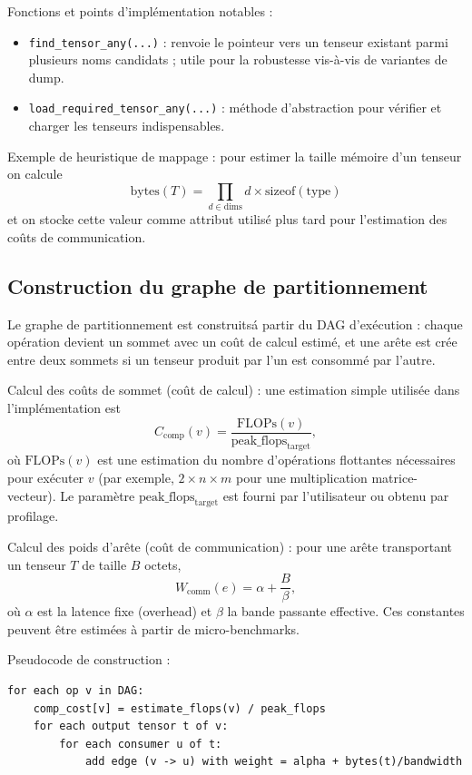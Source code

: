 \documentclass[11pt,a4paper]{article}
\begin{document}
Fonctions et points d'impl\'ementation notables :
\begin{itemize}[leftmargin=*]
	\item \texttt{find\_tensor\_any(...)} : renvoie le pointeur vers un tenseur existant parmi plusieurs noms candidats ; utile pour la robustesse vis-\`a-vis de variantes de dump.
	\item \texttt{load\_required\_tensor\_any(...)} : m\'ethode d'abstraction pour v\'erifier et charger les tenseurs indispensables.
\end{itemize}

Exemple de heuristique de mappage : pour estimer la taille m\'emoire d'un tenseur on calcule
\[
\mathrm{bytes}(T) = \prod_{d\in \mathrm{dims}} d \times \mathrm{sizeof}(\text{type})
\]
et on stocke cette valeur comme attribut utilis\'e plus tard pour l'estimation des co\^uts de communication.

\subsection{Construction du graphe de partitionnement}

Le graphe de partitionnement est construits\'a partir du DAG d'ex\'ecution : chaque op\'eration devient un sommet avec un co\^ut de calcul estim\'e, et une ar\^ete est cr\'ee entre deux sommets si un tenseur produit par l'un est consomm\'e par l'autre.

Calcul des co\^uts de sommet (co\^ut de calcul) : une estimation simple utilis\'ee dans l'impl\'ementation est
\[
C_{\mathrm{comp}}(v) = \frac{\mathrm{FLOPs}(v)}{\mathrm{peak\_flops}_{\mathrm{target}}},
\]
o\`u $\mathrm{FLOPs}(v)$ est une estimation du nombre d'op\'erations flottantes n\'ecessaires pour ex\'ecuter $v$ (par exemple, $2\times n \times m$ pour une multiplication matrice-vecteur). Le param\`etre $\mathrm{peak\_flops}_{\mathrm{target}}$ est fourni par l'utilisateur ou obtenu par profilage.

Calcul des poids d'ar\^ete (co\^ut de communication) : pour une ar\^ete transportant un tenseur $T$ de taille $B$ octets,
\[
W_{\mathrm{comm}}(e) = \alpha + \frac{B}{\beta},
\]
o\`u $\alpha$ est la latence fixe (overhead) et $\beta$ la bande passante effective. Ces constantes peuvent \^etre estim\'ees \`a partir de micro-benchmarks.

Pseudocode de construction :
\begin{verbatim}
for each op v in DAG:
	comp_cost[v] = estimate_flops(v) / peak_flops
	for each output tensor t of v:
		for each consumer u of t:
			add edge (v -> u) with weight = alpha + bytes(t)/bandwidth
\end{verbatim}
\end{document}
